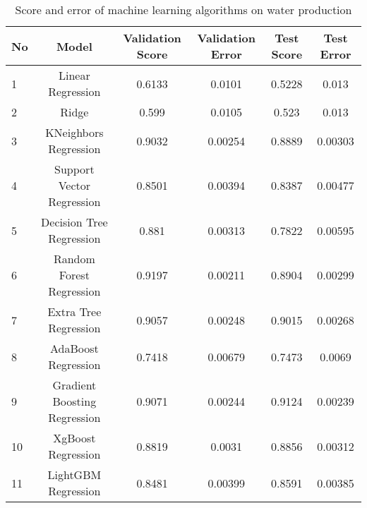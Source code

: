 \documentclass[english]{article}
\begin{document}
\begin{appendices}
\begin{table}[H]
\centering
\caption{Score and error of machine learning algorithms on water production}
\begin{tabular}{|l|c|c|c|c|c|}
\hline
\textbf{No} & \textbf{Model}               & \textbf{Validation Score} & \textbf{Validation Error} & \textbf{Test Score} & \textbf{Test Error} \\ \hline
1           & Linear Regression            & 0.6133                    & 0.0101                    & 0.5228              & 0.013               \\ \hline
2           & Ridge                        & 0.599                     & 0.0105                    & 0.523               & 0.013               \\ \hline
3           & KNeighbors Regression        & 0.9032                    & 0.00254                   & 0.8889              & 0.00303             \\ \hline
4           & Support Vector Regression    & 0.8501                    & 0.00394                   & 0.8387              & 0.00477             \\ \hline
5           & Decision Tree Regression     & 0.881                     & 0.00313                   & 0.7822              & 0.00595             \\ \hline
6           & Random Forest Regression     & 0.9197                    & 0.00211                   & 0.8904              & 0.00299             \\ \hline
7           & Extra Tree Regression        & 0.9057                    & 0.00248                   & 0.9015              & 0.00268             \\ \hline
8           & AdaBoost Regression          & 0.7418                    & 0.00679                   & 0.7473              & 0.0069              \\ \hline
9           & Gradient Boosting Regression & 0.9071                    & 0.00244                   & 0.9124              & 0.00239             \\ \hline
10          & XgBoost Regression           & 0.8819                    & 0.0031                    & 0.8856              & 0.00312             \\ \hline
11          & LightGBM Regression          & 0.8481                    & 0.00399                   & 0.8591              & 0.00385             \\ \hline
\end{tabular}
\end{table}

\end{appendices}
\end{document}
